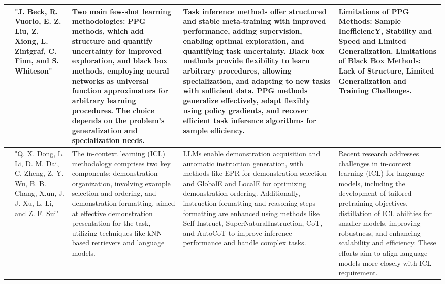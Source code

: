 \documentclass[conference]{IEEEtran}
\begin{document}
\begin{table}
\begin{center}
\begin{tabular}{ |p{1cm}|p{2cm}|p{4cm}|p{4cm}|p{4cm}| }
\hline
[37] & "J. Beck, R. Vuorio, E. Z. Liu, Z. Xiong, L. Zintgraf, C. Finn, and S. Whiteson" & Two main few-shot learning methodologies: PPG methods, which add structure and quantify uncertainty for improved exploration, and black box methods, employing neural networks as universal function approximators for arbitrary learning procedures. The choice depends on the problem's generalization and specialization needs. & Task inference methods offer structured and stable meta-training with improved performance, adding supervision, enabling optimal exploration, and quantifying task uncertainty. Black box methods provide flexibility to learn arbitrary procedures, allowing specialization, and adapting to new tasks with sufficient data. PPG methods generalize effectively, adapt flexibly using policy gradients, and recover efficient task inference algorithms for sample efficiency. & Limitations of PPG Methods: Sample InefficiencY, Stability and Speed and Limited Generalization.
Limitations of Black Box Methods: Lack of Structure, Limited Generalization and Training Challenges. \\
\hline
[38]  & "Q. X. Dong, L. Li, D. M. Dai, C. Zheng, Z. Y. Wu, B. B. Chang, X.un, J. J. Xu, L. Li, and Z. F. Sui" & The in-context learning (ICL) methodology comprises two key components: demonstration organization, involving example selection and ordering, and demonstration formatting, aimed at effective demonstration presentation for the task, utilizing techniques like kNN-based retrievers and language models. & LLMs enable demonstration acquisition and automatic instruction generation, with methods like EPR for demonstration selection and GlobalE and LocalE for optimizing demonstration ordering. Additionally, instruction formatting and reasoning steps formatting are enhanced using methods like Self Instruct, SuperNaturalInstruction, CoT, and AutoCoT to improve inference performance and handle complex tasks. & Recent research addresses challenges in in-context learning (ICL) for language models, including the development of tailored pretraining objectives, distillation of ICL abilities for smaller models, improving robustness, and enhancing scalability and efficiency. These efforts aim to align language models more closely with ICL requirement. \\
\hline
\end{tabular}
\end{center}
\end{table}
\end{document}
